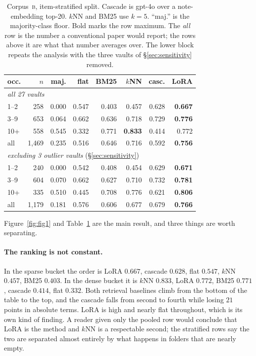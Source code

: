 \documentclass[11pt]{article}
\newcommand{\corpB}{\textsc{b}}
\begin{document}
\begin{table}[t]
  \centering
  \small
  \setlength{\tabcolsep}{2.6pt}
  \begin{tabular}{@{}lrrrrrrr@{}}
    \toprule
    occ. & $n$ & maj. & flat & BM25 & $k$NN & casc. & LoRA \\
    \midrule
    \multicolumn{8}{l}{\emph{all 27 vaults}}\\
    1--2  & 258 & 0.000 & 0.547 & 0.403 & 0.457 & 0.628 & \textbf{0.667} \\
    3--9  & 653 & 0.064 & 0.662 & 0.636 & 0.718 & 0.729 & \textbf{0.776} \\
    10+   & 558 & 0.545 & 0.332 & 0.771 & \textbf{0.833} & 0.414 & 0.772 \\
    all   & 1{,}469 & 0.235 & 0.516 & 0.646 & 0.716 & 0.592 & \textbf{0.756} \\
    \midrule
    \multicolumn{8}{l}{\emph{excluding 3 outlier vaults} (\S\ref{sec:sensitivity})}\\
    1--2  & 240 & 0.000 & 0.542 & 0.408 & 0.454 & 0.629 & \textbf{0.671} \\
    3--9  & 604 & 0.070 & 0.662 & 0.627 & 0.710 & 0.732 & \textbf{0.781} \\
    10+   & 335 & 0.510 & 0.445 & 0.708 & 0.776 & 0.621 & \textbf{0.806} \\
    all   & 1{,}179 & 0.181 & 0.576 & 0.606 & 0.677 & 0.679 & \textbf{0.766} \\
    \bottomrule
  \end{tabular}
  \caption{Corpus~\corpB{}, item-stratified split. Cascade is gpt-4o over a note-embedding top-20. $k$NN and BM25 use $k{=}5$. ``maj.'' is the majority-class floor. Bold marks the row maximum. The \emph{all} row is the number a conventional paper would report; the rows above it are what that number averages over. The lower block repeats the analysis with the three vaults of \S\ref{sec:sensitivity} removed.}
  \label{tab:corpusb}
\end{table}

Figure~\ref{fig:fig1} and Table~\ref{tab:corpusb} are the main result, and three things are worth separating.

\paragraph{The ranking is not constant.}
In the sparse bucket the order is LoRA $0.667$, cascade $0.628$, flat $0.547$, $k$NN $0.457$, BM25 $0.403$.
In the dense bucket it is $k$NN $0.833$, LoRA $0.772$, BM25 $0.771$, cascade $0.414$, flat $0.332$.
Both retrieval baselines climb from the bottom of the table to the top, and the cascade falls from second to fourth while losing $21$ points in absolute terms.
LoRA is high and nearly flat throughout, which is its own kind of finding.
A reader given only the pooled row would conclude that LoRA is the method and $k$NN is a respectable second; the stratified rows say the two are separated almost entirely by what happens in folders that are nearly empty.
\end{document}
